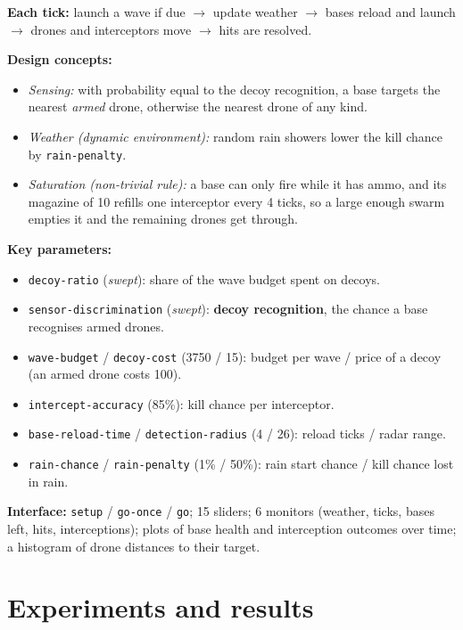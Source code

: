 \documentclass[12pt,a4paper]{article}
\begin{document}
\textbf{Each tick:} launch a wave if due $\rightarrow$ update weather $\rightarrow$ bases reload and launch $\rightarrow$ drones and interceptors move $\rightarrow$ hits are resolved.

\textbf{Design concepts:}
\begin{itemize}
    \item \emph{Sensing:} with probability equal to the decoy recognition, a base targets the nearest \emph{armed} drone, otherwise the nearest drone of any kind.
    \item \emph{Weather (dynamic environment):} random rain showers lower the kill chance by \texttt{rain-penalty}.
    \item \emph{Saturation (non-trivial rule):} a base can only fire while it has ammo, and its magazine of 10 refills one interceptor every 4 ticks, so a large enough swarm empties it and the remaining drones get through.
\end{itemize}

\textbf{Key parameters:}
\begin{itemize}
    \item \texttt{decoy-ratio} (\textit{swept}): share of the wave budget spent on decoys.
    \item \texttt{sensor-discrimination} (\textit{swept}): \textbf{decoy recognition}, the chance a base recognises armed drones.
    \item \texttt{wave-budget} / \texttt{decoy-cost} (3750 / 15): budget per wave / price of a decoy (an armed drone costs 100).
    \item \texttt{intercept-accuracy} (85\%): kill chance per interceptor.
    \item \texttt{base-reload-time} / \texttt{detection-radius} (4 / 26): reload ticks / radar range.
    \item \texttt{rain-chance} / \texttt{rain-penalty} (1\% / 50\%): rain start chance / kill chance lost in rain.
\end{itemize}

\textbf{Interface:} \texttt{setup} / \texttt{go-once} / \texttt{go}; 15 sliders; 6 monitors (weather, ticks, bases left, hits, interceptions); plots of base health and interception outcomes over time; a histogram of drone distances to their target.

\newpage
\section{Experiments and results}
\end{document}
